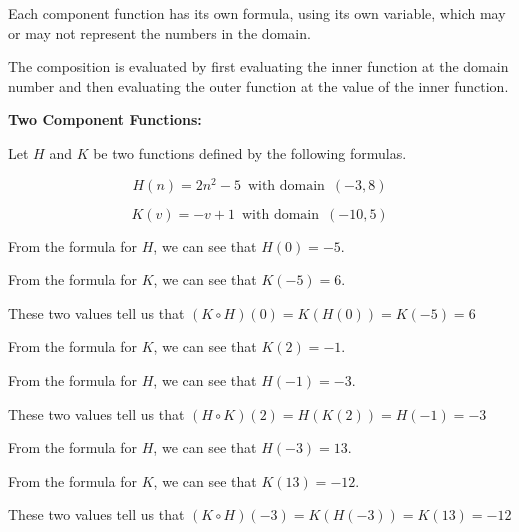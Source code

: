 \documentclass{ximera}
\begin{document}
Each component function has its own formula, using its own variable, which may or may not represent the numbers in the domain.

The composition is evaluated by first evaluating the inner function at the domain number and then evaluating the outer function at the value of the inner function.




\textbf{Two Component Functions:}


Let $H$ and $K$ be two functions defined by the following formulas.

\[
H(n) = 2 n^2 - 5 \,  \text{ with domain }  \,  (-3, 8)
\]


\[
K(v) = -v + 1 \,  \text{ with domain }  \,  (-10, 5)
\]





\begin{example}

From the formula for $H$, we can see that $H(0) = -5$.

From the formula for $K$, we can see that $K(-5) = 6$.

These two values tell us that $(K \circ H)(0) = K(H(0)) = K(-5) = 6$

\end{example}






\begin{example}

From the formula for $K$, we can see that $K(2) = -1$.

From the formula for $H$, we can see that $H(-1) = -3$.

These two values tell us that $(H \circ K)(2) = H(K(2)) = H(-1) = -3$

\end{example}









\begin{example}

From the formula for $H$, we can see that $H(-3) = 13$.

From the formula for $K$, we can see that $K(13) = -12$.

These two values tell us that $(K \circ H)(-3) = K(H(-3)) = K(13) = -12$

\end{example}
\end{document}
